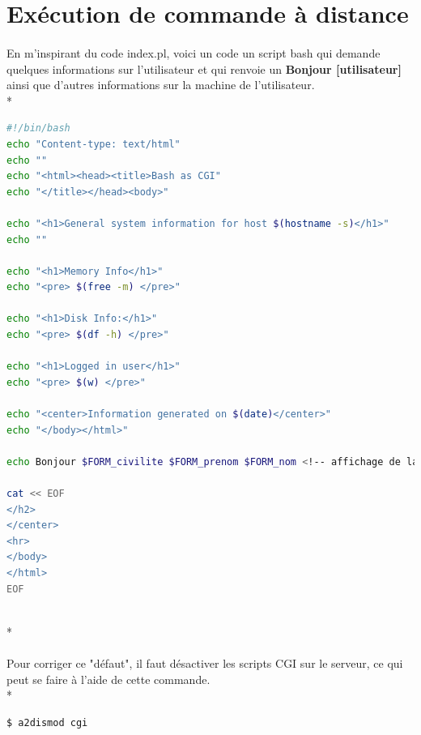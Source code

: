 \documentclass{article}
\begin{document}

\section{Ex\'{e}cution de commande \`{a} distance}

\paragraph{}
En m'inspirant du code index.pl, voici un code un script bash qui demande quelques informations sur l'utilisateur et qui renvoie un \textbf{Bonjour [utilisateur]} ainsi que d'autres informations sur la machine de l'utilisateur. \\*
\begin{tcolorbox}
\begin{lstlisting}[language=sh]
#!/bin/bash
echo "Content-type: text/html"
echo ""
echo "<html><head><title>Bash as CGI"
echo "</title></head><body>"

echo "<h1>General system information for host $(hostname -s)</h1>"
echo ""

echo "<h1>Memory Info</h1>"
echo "<pre> $(free -m) </pre>"

echo "<h1>Disk Info:</h1>"
echo "<pre> $(df -h) </pre>"

echo "<h1>Logged in user</h1>"
echo "<pre> $(w) </pre>"

echo "<center>Information generated on $(date)</center>"
echo "</body></html>"

echo Bonjour $FORM_civilite $FORM_prenom $FORM_nom <!-- affichage de la civilit\'{e}, du prenom et du nom de la personne -->

cat << EOF
</h2>
</center>
<hr>
</body>
</html>
EOF
\end{lstlisting}
\end{tcolorbox}
~\\*
\paragraph{}
Pour corriger ce "d\'{e}faut", il faut d\'{e}sactiver les scripts CGI sur le serveur, ce qui peut se faire \`{a} l'aide de cette commande.\\*
\begin{tcolorbox}
\begin{lstlisting}[language=sh]
$ a2dismod cgi
\end{lstlisting}
\end{tcolorbox}
\end{document}
